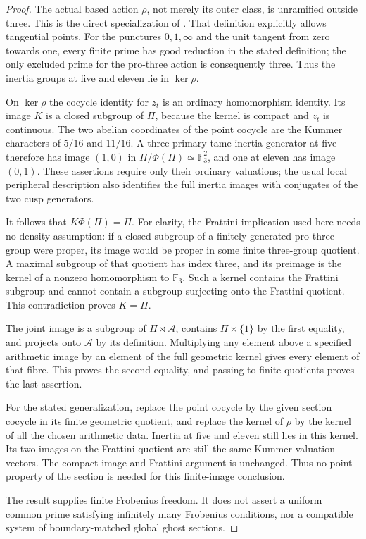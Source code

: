 \begin{proof}
The actual based action $\rho$, not merely its outer class,
is unramified outside three. This is the direct specialization
of \citet[Definition 2.0 and Theorem 2.1, pp.198--200]
{AuditWojtkowiak2007}. That definition explicitly allows
tangential points. For the punctures $0,1,\infty$ and the
unit tangent from zero towards one, every finite prime
has good reduction in the stated definition; the only
excluded prime for the pro-three action is consequently
three. Thus the inertia groups at five and eleven lie
in $\ker\rho$.

On $\ker\rho$ the cocycle identity for $z_t$ is an
ordinary homomorphism identity. Its image $K$ is a closed
subgroup of $\Pi$, because the kernel is compact and
$z_t$ is continuous. The two abelian coordinates of the
point cocycle are the Kummer characters of $5/16$ and
$11/16$. A three-primary tame inertia generator at five
therefore has image $(1,0)$ in
$\Pi/\Phi(\Pi)\simeq\mathbb F_3^2$, and one at eleven
has image $(0,1)$. These assertions require only their
ordinary valuations; the usual local peripheral
description also identifies the full inertia images
with conjugates of the two cusp generators.

It follows that $K\Phi(\Pi)=\Pi$. For clarity, the
Frattini implication used here needs no density
assumption: if a closed subgroup of a finitely generated
pro-three group were proper, its image would be proper
in some finite three-group quotient. A maximal subgroup
of that quotient has index three, and its preimage is
the kernel of a nonzero homomorphism to $\mathbb F_3$.
Such a kernel contains the Frattini subgroup and cannot
contain a subgroup surjecting onto the Frattini quotient.
This contradiction proves $K=\Pi$.

The joint image is a subgroup of $\Pi\rtimes\mathcal A$,
contains $\Pi\times\{1\}$ by the first equality, and
projects onto $\mathcal A$ by its definition. Multiplying
any element above a specified arithmetic image by an
element of the full geometric kernel gives every element
of that fibre. This proves the second equality, and
passing to finite quotients proves the last assertion.

For the stated generalization, replace the point cocycle
by the given section cocycle in its finite geometric
quotient, and replace the kernel of $\rho$ by the kernel
of all the chosen arithmetic data. Inertia at five and
eleven still lies in this kernel. Its two images on the
Frattini quotient are still the same Kummer valuation
vectors. The compact-image and Frattini argument is
unchanged. Thus no point property of the section is
needed for this finite-image conclusion.

The result supplies finite Frobenius freedom. It does
not assert a uniform common prime satisfying infinitely
many Frobenius conditions, nor a compatible system of
boundary-matched global ghost sections.
\end{proof}

